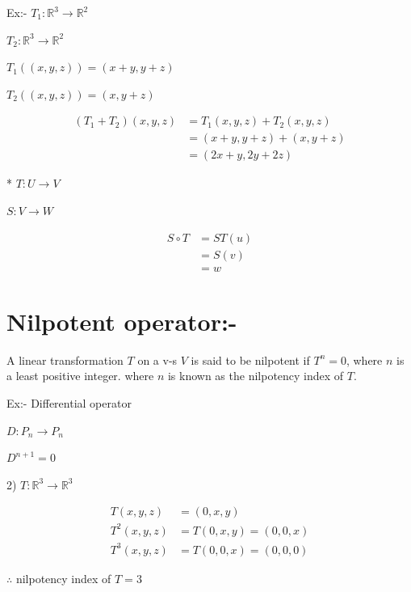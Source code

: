 Ex:- $T_1 : \mathbb{R}^3 \to \mathbb{R}^2$

$T_2 : \mathbb{R}^3 \to \mathbb{R}^2$

$T_1((x,y,z)) = (x+y, y+z)$

$T_2((x,y,z)) = (x, y+z)$

\begin{align*}
(T_1 + T_2)(x,y,z) &= T_1(x,y,z) + T_2(x,y,z) \\
&= (x+y, y+z) + (x, y+z) \\
&= (2x+y, 2y+2z)
\end{align*}

* $T : U \to V$

$S : V \to W$

\begin{align*}
S \circ T &= ST(u) \\
&= S(v) \\
&= w
\end{align*}

\section*{Nilpotent operator:-}

A linear transformation $T$ on a v-s $V$ is said to be nilpotent if $T^n = 0$, where $n$ is a least positive integer. where $n$ is known as the nilpotency index of $T$.

Ex:- Differential operator

$D : P_n \to P_n$

$D^{n+1} = 0$

2) $T : \mathbb{R}^3 \to \mathbb{R}^3$

\begin{align*}
T(x,y,z) &= (0,x,y) \\
T^2(x,y,z) &= T(0,x,y) = (0,0,x) \\
T^3(x,y,z) &= T(0,0,x) = (0,0,0)
\end{align*}

$\therefore$ nilpotency index of $T = 3$
